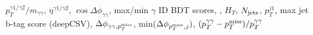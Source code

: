 $p_T^{\gamma 1/\gamma 2}/m_{\gamma\gamma}$, $\eta^{\gamma 1/\gamma 2}$, $\cos{\Delta\phi_{\gamma\gamma}}$, max/min $\gamma$ ID BDT scores, \met, $H_T$, $N_{\rm{jets}}$, $p_T^{j1}$, max jet b-tag score (deepCSV), $\Delta\phi_{\gamma\gamma,p^\textrm{miss}_{T}}$, min($\Delta\phi_{p^\textrm{miss}_{T},j})$, $(p_T^{\gamma\gamma}-p^\textrm{miss}_{T})/p_T^{\gamma\gamma}$